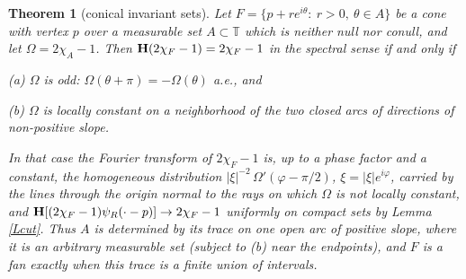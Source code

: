 \documentclass{article}
\newtheorem{theorem}{Theorem}
\def\H{{\bf H}}
\def\T{{\mathbb T}}
\begin{document}
	\begin{theorem}[conical invariant sets]\label{Tcone}
		Let $F=\{p+re^{i\theta}:\ r>0,\ \theta\in A\}$ be a cone with vertex $p$ over a measurable set $A\subset\T$ which is neither null nor conull, and let $\Omega=2\chi_A-1$. Then $\H(2\chi_F-1)=2\chi_F-1$ in the spectral sense if and only if

		(a) $\Omega$ is odd: $\Omega(\theta+\pi)=-\Omega(\theta)$ a.e., and

		(b) $\Omega$ is locally constant on a neighborhood of the two closed arcs of directions of non-positive slope.

		\noindent In that case the Fourier transform of $2\chi_F-1$ is, up to a phase factor and a constant, the homogeneous distribution $|\xi|^{-2}\,\Omega'(\varphi-\pi/2)$, $\xi=|\xi|e^{i\varphi}$, carried by the lines through the origin normal to the rays on which $\Omega$ is not locally constant, and $\H[(2\chi_F-1)\psi_R(\cdot-p)]\to2\chi_F-1$ uniformly on compact sets by Lemma \ref{Lcut}. Thus $A$ is determined by its trace on one open arc of positive slope, where it is an arbitrary measurable set (subject to (b) near the endpoints), and $F$ is a fan exactly when this trace is a finite union of intervals.
	\end{theorem}
\end{document}
